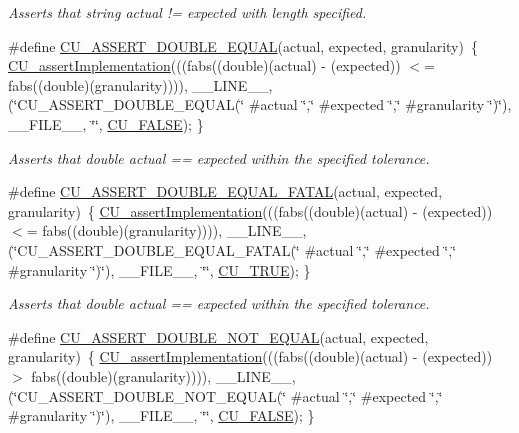 \begin{DoxyCompactItemize}
\begin{DoxyCompactList}\small\item\em Asserts that string actual != expected with length specified. \end{DoxyCompactList}\item 
\#define \hyperlink{group___framework_ga8ac0c06b5f46fe924aafad37e40fa46d}{C\+U\+\_\+\+A\+S\+S\+E\+R\+T\+\_\+\+D\+O\+U\+B\+L\+E\+\_\+\+E\+Q\+U\+A\+L}(actual, expected, granularity)~\{ \hyperlink{group___framework_gad409fc536d9d3fb5f659c76421e8ce3b}{C\+U\+\_\+assert\+Implementation}(((fabs((double)(actual) -\/ (expected)) $<$= fabs((double)(granularity)))), \+\_\+\+\_\+\+L\+I\+N\+E\+\_\+\+\_\+, (\char`\"{}C\+U\+\_\+\+A\+S\+S\+E\+R\+T\+\_\+\+D\+O\+U\+B\+L\+E\+\_\+\+E\+Q\+U\+A\+L(\char`\"{} \#actual \char`\"{},\char`\"{}  \#expected \char`\"{},\char`\"{} \#granularity \char`\"{})\char`\"{}), \+\_\+\+\_\+\+F\+I\+L\+E\+\_\+\+\_\+, \char`\"{}\char`\"{}, \hyperlink{group___framework_ga7453214541b156ef868681eaafe60860}{C\+U\+\_\+\+F\+A\+L\+S\+E}); \}
\begin{DoxyCompactList}\small\item\em Asserts that double actual == expected within the specified tolerance. \end{DoxyCompactList}\item 
\#define \hyperlink{group___framework_gadf7c38041d5b97f69727b434c6fd88f5}{C\+U\+\_\+\+A\+S\+S\+E\+R\+T\+\_\+\+D\+O\+U\+B\+L\+E\+\_\+\+E\+Q\+U\+A\+L\+\_\+\+F\+A\+T\+A\+L}(actual, expected, granularity)~\{ \hyperlink{group___framework_gad409fc536d9d3fb5f659c76421e8ce3b}{C\+U\+\_\+assert\+Implementation}(((fabs((double)(actual) -\/ (expected)) $<$= fabs((double)(granularity)))), \+\_\+\+\_\+\+L\+I\+N\+E\+\_\+\+\_\+, (\char`\"{}C\+U\+\_\+\+A\+S\+S\+E\+R\+T\+\_\+\+D\+O\+U\+B\+L\+E\+\_\+\+E\+Q\+U\+A\+L\+\_\+\+F\+A\+T\+A\+L(\char`\"{} \#actual \char`\"{},\char`\"{}  \#expected \char`\"{},\char`\"{} \#granularity \char`\"{})\char`\"{}), \+\_\+\+\_\+\+F\+I\+L\+E\+\_\+\+\_\+, \char`\"{}\char`\"{}, \hyperlink{group___framework_ga99641394bc766ca9c4a295e942fed1ef}{C\+U\+\_\+\+T\+R\+U\+E}); \}
\begin{DoxyCompactList}\small\item\em Asserts that double actual == expected within the specified tolerance. \end{DoxyCompactList}\item 
\#define \hyperlink{group___framework_gaef75e3caa15492e72fab9f3b56795aea}{C\+U\+\_\+\+A\+S\+S\+E\+R\+T\+\_\+\+D\+O\+U\+B\+L\+E\+\_\+\+N\+O\+T\+\_\+\+E\+Q\+U\+A\+L}(actual, expected, granularity)~\{ \hyperlink{group___framework_gad409fc536d9d3fb5f659c76421e8ce3b}{C\+U\+\_\+assert\+Implementation}(((fabs((double)(actual) -\/ (expected)) $>$ fabs((double)(granularity)))), \+\_\+\+\_\+\+L\+I\+N\+E\+\_\+\+\_\+, (\char`\"{}C\+U\+\_\+\+A\+S\+S\+E\+R\+T\+\_\+\+D\+O\+U\+B\+L\+E\+\_\+\+N\+O\+T\+\_\+\+E\+Q\+U\+A\+L(\char`\"{} \#actual \char`\"{},\char`\"{}  \#expected \char`\"{},\char`\"{} \#granularity \char`\"{})\char`\"{}), \+\_\+\+\_\+\+F\+I\+L\+E\+\_\+\+\_\+, \char`\"{}\char`\"{}, \hyperlink{group___framework_ga7453214541b156ef868681eaafe60860}{C\+U\+\_\+\+F\+A\+L\+S\+E}); \}

\end{DoxyCompactItemize}
